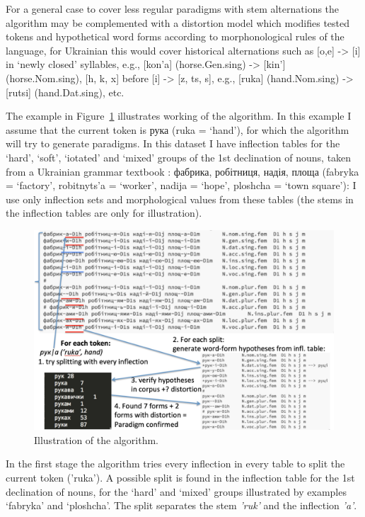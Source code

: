 \documentclass[11pt,a4paper]{article}
\begin{document}
For a general case to cover less regular paradigms with stem alternations the algorithm may be complemented with a distortion model which modifies tested tokens and hypothetical word forms according to morphonological rules of the language, for Ukrainian this would cover historical alternations such as [o,e] -> [i] in `newly closed' syllables, e.g., [kon'a] (horse.Gen.sing) -> [kin'] (horse.Nom.sing), [h, k, x] before [i] -> [z, ts, s], e.g., [ruka] (hand.Nom.sing) -> [rutsi] (hand.Dat.sing), etc.  

The example in Figure~\ref{fig:alg_example} illustrates working of the algorithm. In this example I assume that the current token is рука (ruka = `hand'), for which the algorithm will try to generate paradigms. In this dataset I have inflection tables for the `hard', `soft', `iotated' and `mixed' groups of the 1st declination of nouns, taken from a Ukrainian grammar textbook \cite{hryshchenko1997sulm}: фабрика, робітниця, надія, площа (fabryka = `factory', robitnyts'a = `worker', nadija = `hope', ploshcha = `town square'): I use only inflection sets and morphological values from these tables (the stems in the inflection tables are only for illustration).

\begin{figure}
	\includegraphics[width=\linewidth]{algorithm-illustration.jpg}
	\caption{Illustration of the algorithm.}
	\label{fig:alg_example}
\end{figure}

In the first stage the algorithm tries every inflection in every table to split the current token ('ruka'). A possible split is found in the inflection table for the 1st declination of nouns, for the `hard' and `mixed' groups illustrated by examples `fabryka' and `ploshcha'. The split separates the stem \emph{'ruk'} and the inflection \emph{'a'}.
\end{document}
